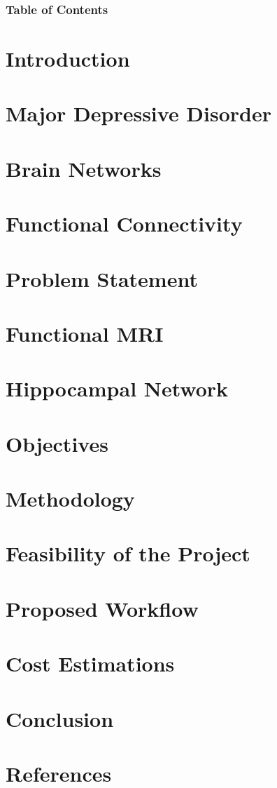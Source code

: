 \documentclass{beamer}
\begin{document}
\begin{frame}[t]
  \frametitle{Table of Contents}
  \tableofcontents
  \section{Introduction}
  \section{Major Depressive Disorder}
  \section{Brain Networks}
  \section{Functional Connectivity}
  \section{Problem Statement}
  \section{Functional MRI}
  \section{Hippocampal Network}
  \section{Objectives}
  \section{Methodology}
  \section{Feasibility of the Project}
  \section{Proposed Workflow}
  \section{Cost Estimations}
  \section{Conclusion}
  \section{References}
\end{frame}
\end{document}
